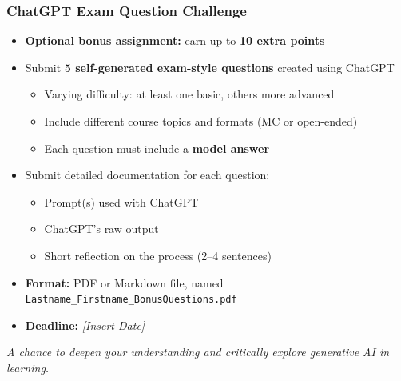\documentclass[aspectratio=169, 10pt]{beamer}
\begin{document}
\begin{frame}
\frametitle{ChatGPT Exam Question Challenge}

\begin{itemize}
  \item \textbf{Optional bonus assignment:} earn up to \textbf{10 extra points}
  \item Submit \textbf{5 self-generated exam-style questions} created using ChatGPT
  \begin{itemize}
    \item Varying difficulty: at least one basic, others more advanced
    \item Include different course topics and formats (MC or open-ended)
    \item Each question must include a \textbf{model answer}
  \end{itemize}
  \item Submit detailed documentation for each question:
  \begin{itemize}
    \item Prompt(s) used with ChatGPT
    \item ChatGPT’s raw output
    \item Short reflection on the process (2–4 sentences)
  \end{itemize}
  \item \textbf{Format:} PDF or Markdown file, named \texttt{Lastname\_Firstname\_BonusQuestions.pdf}
  \item \textbf{Deadline:} \textit{[Insert Date]}
\end{itemize}

\vspace{0.8em}
\centering
\textit{A chance to deepen your understanding and critically explore generative AI in learning.}
\end{frame}
\end{document}
